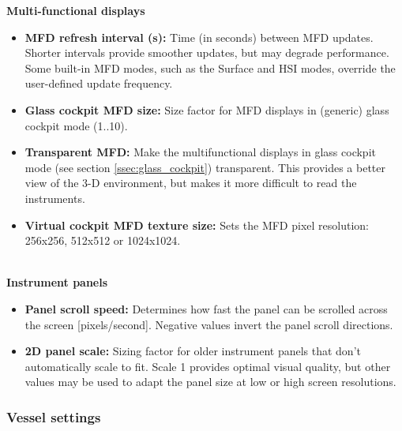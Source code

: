 \documentclass[Orbiter User Manual.tex]{subfiles}
\begin{document}
\textbf{Multi-functional displays}
\begin{itemize}
\item \textbf{MFD refresh interval (s):} Time (in seconds) between MFD updates. Shorter intervals provide smoother updates, but may degrade performance. Some built-in MFD modes, such as the Surface and HSI modes, override the user-defined update frequency.
\item \textbf{Glass cockpit MFD size:} Size factor for MFD displays in (generic) glass cockpit mode (1..10).
\item \textbf{Transparent MFD:} Make the multifunctional displays in glass cockpit mode (see section \ref{ssec:glass_cockpit}) transparent. This provides a better view of the 3-D environment, but makes it more difficult to read the instruments.
\item \textbf{Virtual cockpit MFD texture size:} Sets the MFD pixel resolution: 256x256, 512x512 or 1024x1024.
\end{itemize}
\noindent
\\
\textbf{Instrument panels}
\begin{itemize}
\item \textbf{Panel scroll speed:} Determines how fast the panel can be scrolled across the screen [pixels/second]. Negative values invert the panel scroll directions.
\item \textbf{2D panel scale:} Sizing factor for older instrument panels that don't automatically scale to fit. Scale 1 provides optimal visual quality, but other values may be used to adapt the panel size at low or high screen resolutions.
\end{itemize}

\subsubsection{Vessel settings}
\begin{figure}[H]
	\centering
\end{figure}
\end{document}
